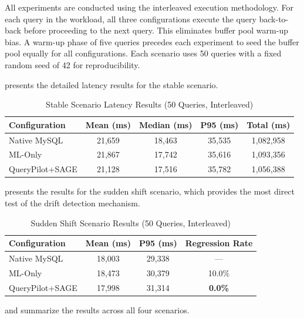 All experiments are conducted using the interleaved execution methodology.
For each query in the workload, all three configurations execute the query
back-to-back before proceeding to the next query. This eliminates buffer pool
warm-up bias. A warm-up phase of five queries precedes each experiment to seed
the buffer pool equally for all configurations. Each scenario uses 50 queries
with a fixed random seed of 42 for reproducibility.

 presents the detailed latency results for the
stable scenario.

\begin{table}[htbp]
  \centering
  \caption{Stable Scenario Latency Results (50 Queries, Interleaved)}
  \label{tab:stable_results}
  \renewcommand{\arraystretch}{1.3}
  \begin{tabular}{|l|c|c|c|c|}
    \hline
    \textbf{Configuration} & \textbf{Mean (ms)} & \textbf{Median (ms)} & \textbf{P95 (ms)} & \textbf{Total (ms)} \\
    \hline
    Native MySQL    & 21,659 & 18,463 & 35,535 & 1,082,958 \\
    ML-Only         & 21,867 & 17,742 & 35,616 & 1,093,356 \\
    QueryPilot+SAGE & 21,128 & 17,516 & 35,782 & 1,056,388 \\
    \hline
  \end{tabular}
\end{table}

 presents the results for the sudden shift scenario,
which provides the most direct test of the drift detection mechanism.

\begin{table}[htbp]
  \centering
  \caption{Sudden Shift Scenario Results (50 Queries, Interleaved)}
  \label{tab:sudden_results}
  \renewcommand{\arraystretch}{1.3}
  \begin{tabular}{|l|c|c|c|}
    \hline
    \textbf{Configuration} & \textbf{Mean (ms)} & \textbf{P95 (ms)} & \textbf{Regression Rate} \\
    \hline
    Native MySQL    & 18,003 & 29,338 & --- \\
    ML-Only         & 18,473 & 30,379 & 10.0\% \\
    QueryPilot+SAGE & 17,998 & 31,314 & \textbf{0.0\%} \\
    \hline
  \end{tabular}
\end{table}

 and  summarize the results
across all four scenarios.

